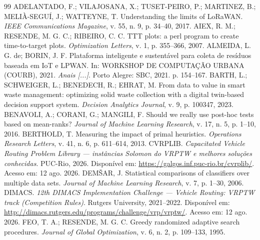 \documentclass[12pt, a4paper]{article}
\begin{document}
\renewcommand{\bibsection}{\section*{Referências}}
\begin{thebibliography}{99}
 ADELANTADO, F.; VILAJOSANA, X.; TUSET-PEIRO, P.; MARTINEZ, B.; MELIÀ-SEGUÍ, J.; WATTEYNE, T. Understanding the limits of LoRaWAN. \textit{IEEE Communications Magazine}, v. 55, n. 9, p. 34--40, 2017.
 AIEX, R. M.; RESENDE, M. G. C.; RIBEIRO, C. C. TTT plots: a perl program to create time-to-target plots. \textit{Optimization Letters}, v. 1, p. 355--366, 2007.
 ALMEIDA, L. G. de; BORIN, J. F. Plataforma inteligente e sustentável para coleta de resíduos baseada em IoT e LPWAN. In: WORKSHOP DE COMPUTAÇÃO URBANA (COURB), 2021. \textit{Anais [...]}. Porto Alegre: SBC, 2021. p. 154--167.
 BARTH, L.; SCHWEIGER, L.; BENEDECH, R.; EHRAT, M. From data to value in smart waste management: optimizing solid waste collection with a digital twin-based decision support system. \textit{Decision Analytics Journal}, v. 9, p. 100347, 2023.
 BENAVOLI, A.; CORANI, G.; MANGILI, F. Should we really use post-hoc tests based on mean-ranks? \textit{Journal of Machine Learning Research}, v. 17, n. 5, p. 1--10, 2016.
 BERTHOLD, T. Measuring the impact of primal heuristics. \textit{Operations Research Letters}, v. 41, n. 6, p. 611--614, 2013.
 CVRPLIB. \textit{Capacitated Vehicle Routing Problem Library --- instâncias Solomon do VRPTW e melhores soluções conhecidas}. PUC-Rio, 2026. Disponível em: \url{https://galgos.inf.puc-rio.br/cvrplib/}. Acesso em: 12 ago. 2026.
 DEM\v{S}AR, J. Statistical comparisons of classifiers over multiple data sets. \textit{Journal of Machine Learning Research}, v. 7, p. 1--30, 2006.
 DIMACS. \textit{12th DIMACS Implementation Challenge --- Vehicle Routing: VRPTW track (Competition Rules)}. Rutgers University, 2021--2022. Disponível em: \url{http://dimacs.rutgers.edu/programs/challenge/vrp/vrptw/}. Acesso em: 12 ago. 2026.
 FEO, T. A.; RESENDE, M. G. C. Greedy randomized adaptive search procedures. \textit{Journal of Global Optimization}, v. 6, n. 2, p. 109--133, 1995.

\end{thebibliography}
\end{document}
